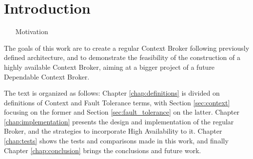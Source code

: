 \chapter{Introduction}

\begin{itemize}
\item[Motivation] 

\end{itemize}




The goals of this work are to create a regular Context Broker following previously defined architecture, and to demonstrate the feasibility of the construction of a highly available Context Broker, aiming at a bigger project of a future Dependable Context Broker.

The text is organized as follows: Chapter \ref{chap:definitions} is divided on definitions of Context and Fault Tolerance terms, with Section \ref{sec:context} focusing on the former and Section \ref{sec:fault_tolerance} on the latter. Chapter \ref{chap:implementation} presents the design and implementation of the regular Broker, and the strategies to incorporate High Availability to it. Chapter \ref{chap:tests} shows the tests and comparisons made in this work, and finally Chapter \ref{chap:conclusion} brings the conclusions and future work.